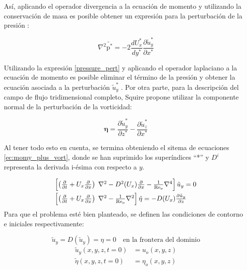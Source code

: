 Así, aplicando el operador divergencia a la ecuación de momento y utilizando la conservación de masa es posible obtener un expresión para la perturbación de la presión \cite{schmid}:

\begin{equation}
\nabla^2 \tilde{\text{p}^*} = -2 \frac{d U^*_x}{d y^*} \frac{\partial \tilde{u}^*_y}{\partial x^*} 
\label{pressure_pert}
\end{equation}

Utilizando la expresión \ref{pressure_pert} y aplicando el operador laplaciano a la ecuación de momento es posible eliminar el término de la presión y obtener la ecuación asociada a la perturbación $\tilde{u}^*_y$ \cite{schmid}. Por otra parte, para la descripción del campo de flujo tridimensional completo, Squire \cite{squire1933} propone utilizar la componente normal de la perturbación de la vorticidad:

\begin{equation*}
\mathbf{\eta} = \frac{\partial \tilde{u}^*_y}{\partial z^*} - \frac{\partial \tilde{u}^*_z}{\partial x^*}
\end{equation*}

Al tener todo esto en cuenta, se termina obteniendo el sitema de ecuaciones \ref{ec:momy_plus_vort}, donde se han suprimido los superíndices ``*'' y $D^i$ representa la derivada i-ésima con respecto a $y$. 


\begin{equation}
\begin{array}{l}
    \left[ \left( \frac{\partial}{\partial t} + U_x \frac{\partial}{\partial x} \right) \hspace{1mm} \nabla^2 - D^2 (U_x) \frac{\partial}{\partial x} - \frac{1}{\text{Re}_o} \nabla^4 \right] \tilde{u}_y = 0 \vspace*{1mm}\\
    \left[ \left( \frac{\partial}{\partial t} + U_x \frac{\partial}{\partial x} \right) \hspace{1mm} \nabla^2 - \frac{1}{\text{Re}_o} \nabla^2 \right] \tilde{\eta} = - D(U_x) \frac{\partial \tilde{u}_y}{\partial z}
\end{array}
\label{ec:momy_plus_vort}
\end{equation} 
Para que el problema esté bien planteado, se definen las condiciones de contorno e iniciales
respectivamente:

\begin{equation}
\tilde{u}_y = D(\tilde{u}_y) = \eta = 0 \quad \text{en la frontera del dominio}  
\label{ec:bc_orr_som}
\end{equation}
\begin{align}
\tilde{u}_y (x,y,z, t=0) &= u_o(x,y,z) \\
\tilde{\eta} (x,y,z, t=0) &= \eta_o(x,y,z)   
\label{ec:init_orr_som}
\end{align}

